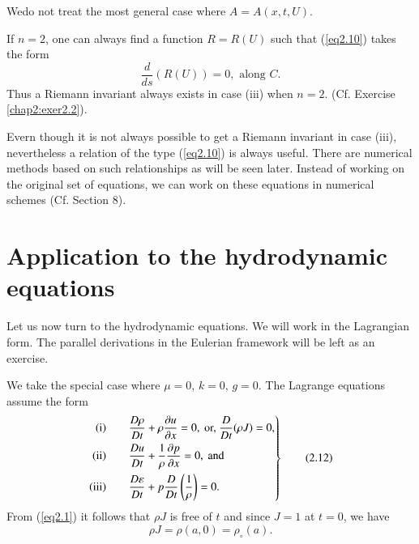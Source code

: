 We\pageoriginale do not treat the most general case where $A = A
(x,t,U)$.

\begin{remark}\label{chap2:rem2.2}
If $n=2$, one can always find a function $R = R (U)$ such that (\ref{eq2.10})
takes the form
\begin{equation*}
\frac{d}{ds} (R (U)) = 0, \text{ along } C. \tag{2.11}\label{eq2.11}
\end{equation*}
Thus a Riemann invariant always exists in case (iii) when
$n=2$. (Cf. Exercise \ref{chap2:exer2.2}).
\end{remark}

\begin{remark}\label{chap2:rem2.3}
Evern though it is not always possible to get a Riemann invariant in
case (iii), nevertheless a relation of the type (\ref{eq2.10}) is always
useful. There are numerical methods based on such relationships as
will be seen later. Instead of working on the original set of
equations, we can work on these equations in numerical schemes
(Cf. Section 8). 
\end{remark}

\section{Application to the hydrodynamic equations}\label{chap2:sec2.3}
Let us now turn to the hydrodynamic equations. We will work in the
Lagrangian form. The parallel derivations in the Eulerian framework
will be left as an exercise.

We take the special case where $\mu = 0$, $k=0$, $g=0$. The Lagrange
equations assume the form 
\begin{equation*}
\left.
\begin{aligned}
{\rm (i)} \qquad  & \frac{D \rho}{D t} + \rho \frac{\partial u}{\partial x} =
  0, \text{ or, } \frac{D}{D t} (\rho J) =0,\\
{\rm (ii)} \qquad  & \frac{D u}{Dt} + \frac{1}{\rho} \frac{\partial
  p}{\partial x} = 0, 
\text{ and }\\
 {\rm (iii)} \qquad  & \frac{D \varepsilon}{D t} + p \frac{D}{Dt}
 \left(\frac{1}{\rho}\right) = 0. 
\end{aligned}
\right\}
\tag{2.12}\label{eq2.12}
\end{equation*}
From (\ref{eq2.1}) it follows that $\rho J$ is free of $t$ and since $J=1$
at $t=0$, we have
\begin{equation*}
\rho J = \rho (a,0) = \rho_\circ(a). 
\tag{2.13}\label{eq2.13}
\end{equation*}

